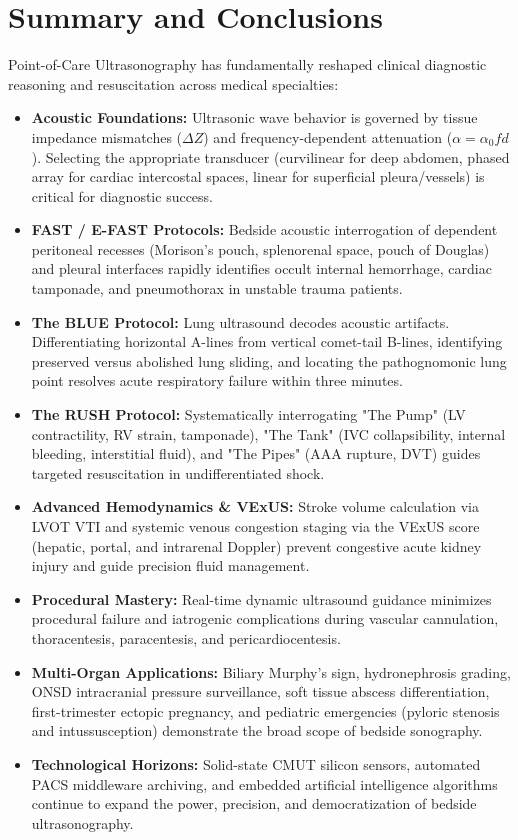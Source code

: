 \documentclass[11pt,a4paper]{article}
\begin{document}
\section{Summary and Conclusions}
Point-of-Care Ultrasonography has fundamentally reshaped clinical diagnostic reasoning and resuscitation across medical specialties:

\begin{itemize}[leftmargin=2em]
    \item \textbf{Acoustic Foundations:} Ultrasonic wave behavior is governed by tissue impedance mismatches ($\Delta Z$) and frequency-dependent attenuation ($\alpha = \alpha_0 f d$). Selecting the appropriate transducer (curvilinear for deep abdomen, phased array for cardiac intercostal spaces, linear for superficial pleura/vessels) is critical for diagnostic success.
    \item \textbf{FAST / E-FAST Protocols:} Bedside acoustic interrogation of dependent peritoneal recesses (Morison's pouch, splenorenal space, pouch of Douglas) and pleural interfaces rapidly identifies occult internal hemorrhage, cardiac tamponade, and pneumothorax in unstable trauma patients.
    \item \textbf{The BLUE Protocol:} Lung ultrasound decodes acoustic artifacts. Differentiating horizontal A-lines from vertical comet-tail B-lines, identifying preserved versus abolished lung sliding, and locating the pathognomonic lung point resolves acute respiratory failure within three minutes.
    \item \textbf{The RUSH Protocol:} Systematically interrogating "The Pump" (LV contractility, RV strain, tamponade), "The Tank" (IVC collapsibility, internal bleeding, interstitial fluid), and "The Pipes" (AAA rupture, DVT) guides targeted resuscitation in undifferentiated shock.
    \item \textbf{Advanced Hemodynamics \& VExUS:} Stroke volume calculation via LVOT VTI and systemic venous congestion staging via the VExUS score (hepatic, portal, and intrarenal Doppler) prevent congestive acute kidney injury and guide precision fluid management.
    \item \textbf{Procedural Mastery:} Real-time dynamic ultrasound guidance minimizes procedural failure and iatrogenic complications during vascular cannulation, thoracentesis, paracentesis, and pericardiocentesis.
    \item \textbf{Multi-Organ Applications:} Biliary Murphy's sign, hydronephrosis grading, ONSD intracranial pressure surveillance, soft tissue abscess differentiation, first-trimester ectopic pregnancy, and pediatric emergencies (pyloric stenosis and intussusception) demonstrate the broad scope of bedside sonography.
    \item \textbf{Technological Horizons:} Solid-state CMUT silicon sensors, automated PACS middleware archiving, and embedded artificial intelligence algorithms continue to expand the power, precision, and democratization of bedside ultrasonography.
\end{itemize}
\end{document}
